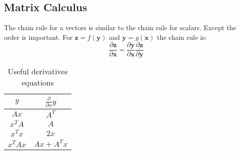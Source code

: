 \subsection*{Matrix Calculus}

The chain rule for a vectors is similar to the chain rule for scalars. Except the order is important. For $\mathbf{z} = f(\mathbf{y})$ and $\mathbf{y} = g(\mathbf{x}) $ the chain rule is:
\begin{equation}
    \frac{\partial \mathbf{z}}{\partial \mathbf{x}} = \frac{\partial \mathbf{y}}{\partial \mathbf{x}}     \frac{\partial \mathbf{z}}{\partial \mathbf{y}}
\end{equation}


\begin{table}[h]
    \centering
    \begin{tabular}{cc}
        \toprule
            $y$ & $\frac{\partial}{\partial x} y$ \\
        \midrule
            $Ax$     & $A^T$ \\
            $x^T A$  & $A$   \\
            $x^T x$  & $2x$  \\  
            $x^T Ax$ & $Ax + A^Tx$  \\          
        \bottomrule
    \end{tabular}
    \caption{Useful derivatives equations}
\end{table}